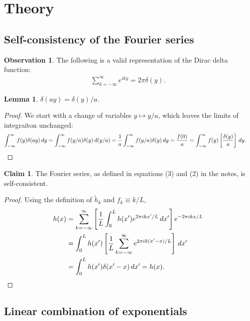 \documentclass{article}
\theoremstyle{definition}
\newtheorem*{claim}{Claim}
\newtheorem*{obs}{Observation}
\newtheorem*{lemma}{Lemma}
\begin{document}
\section{Theory}

\subsection{Self-consistency of the Fourier series}

\begin{obs}
The following is a valid representation of the Dirac delta function:
\begin{align*}
\sum_{k = -\infty}^\infty e^{iky} = 2\pi \delta(y).
\end{align*}
\end{obs}

\begin{lemma}
$\delta(ay) = \delta(y)/a$.
\end{lemma}

\begin{proof} We start with a change of variables $y \mapsto y/a$,
which leaves the limits of integraiton unchanged:
\begin{align*}
\int_{-\infty}^\infty f(y) \delta(ay) \, dy
&= 
\int_{-\infty}^\infty f(y/a) \delta(y) \, d(y/a)
=
{1 \over a} \int_{-\infty}^\infty f(y/a) \delta(y) \, dy
= {f(0) \over a}
=
\int_{-\infty}^\infty f(y) \left[\delta(y) \over a \right] \, dy.
\end{align*}
\end{proof}

\begin{claim}
The Fourier series, as defined in equations (3) and (2) in the notes,
is self-consistent.
\end{claim}

\begin{proof}
Using the definition of $\tilde h_k$ and $f_k \equiv k/L$,
\begin{align*}
h(x) &= \sum_{k = -\infty}^\infty
\left[
    {1 \over L} \int_0^L h(x') e^{2\pi i k x' / L} \, dx'
\right]
e^{-2\pi i k x / L}
\\&=
\int_0^L h(x') \left[
    {1 \over L} \sum_{k = -\infty}^\infty e^{2\pi i k (x' - x) / L}
\right] \, dx'
\\&=
\int_0^L h(x') \delta(x' - x) \, dx'
= h(x).
\end{align*}
\end{proof}

\subsection{Linear combination of exponentials}
\end{document}

